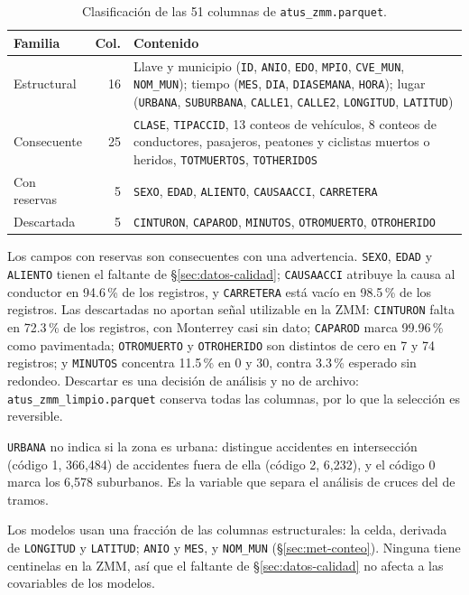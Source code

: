 \begin{table}
	\centering\footnotesize
	\caption{Clasificación de las 51 columnas de \texttt{atus\_zmm.parquet}.}
	\label{tab:datos-variables}
	\begin{tabular}{@{}lrp{}@{}}
		\toprule
		Familia      & Col. & Contenido                                                        \\
		\midrule
		Estructural  & 16   & \raggedright Llave y municipio (\texttt{ID}, \texttt{ANIO},
		\texttt{EDO}, \texttt{MPIO}, \texttt{CVE\_MUN}, \texttt{NOM\_MUN}); tiempo (\texttt{MES},
		\texttt{DIA}, \texttt{DIASEMANA}, \texttt{HORA}); lugar (\texttt{URBANA},
		\texttt{SUBURBANA}, \texttt{CALLE1}, \texttt{CALLE2}, \texttt{LONGITUD},
		\texttt{LATITUD})\tabularnewline
		Consecuente  & 25   & \raggedright \texttt{CLASE}, \texttt{TIPACCID}, 13 conteos de
		vehículos, 8 conteos de conductores, pasajeros, peatones y ciclistas muertos o
		heridos, \texttt{TOTMUERTOS}, \texttt{TOTHERIDOS}\tabularnewline
		Con reservas & 5    & \raggedright \texttt{SEXO}, \texttt{EDAD}, \texttt{ALIENTO},
		\texttt{CAUSAACCI}, \texttt{CARRETERA}\tabularnewline
		Descartada   & 5    & \raggedright \texttt{CINTURON}, \texttt{CAPAROD}, \texttt{MINUTOS},
		\texttt{OTROMUERTO}, \texttt{OTROHERIDO}\tabularnewline
		\bottomrule
	\end{tabular}
\end{table}

Los campos con reservas son consecuentes con una advertencia. \texttt{SEXO},
\texttt{EDAD} y \texttt{ALIENTO} tienen el faltante de §\ref{sec:datos-calidad};
\texttt{CAUSAACCI} atribuye la causa al conductor en 94.6\,\% de los registros, y
\texttt{CARRETERA} está vacío en 98.5\,\% de los registros. Las descartadas no
aportan señal utilizable en la ZMM: \texttt{CINTURON} falta en 72.3\,\% de los
registros, con Monterrey casi sin dato; \texttt{CAPAROD} marca 99.96\,\% como
pavimentada; \texttt{OTROMUERTO} y \texttt{OTROHERIDO} son distintos de cero en 7
y 74 registros; y \texttt{MINUTOS} concentra 11.5\,\% en 0 y 30, contra 3.3\,\%
esperado sin redondeo. Descartar es una decisión de análisis y no de archivo:
\texttt{atus\_zmm\_limpio.parquet} conserva todas las columnas, por lo que la
selección es reversible.

\texttt{URBANA} no indica si la zona es urbana: distingue accidentes en
intersección (código 1, 366,484) de accidentes fuera de ella (código 2, 6,232), y
el código 0 marca los 6,578 suburbanos. Es la variable que separa el análisis de
cruces del de tramos.

Los modelos usan una fracción de las columnas estructurales: la celda, derivada de
\texttt{LONGITUD} y \texttt{LATITUD}; \texttt{ANIO} y \texttt{MES}, y
\texttt{NOM\_MUN} (§\ref{sec:met-conteo}). Ninguna tiene centinelas en la ZMM, así
que el faltante de §\ref{sec:datos-calidad} no afecta a las covariables de los
modelos.
